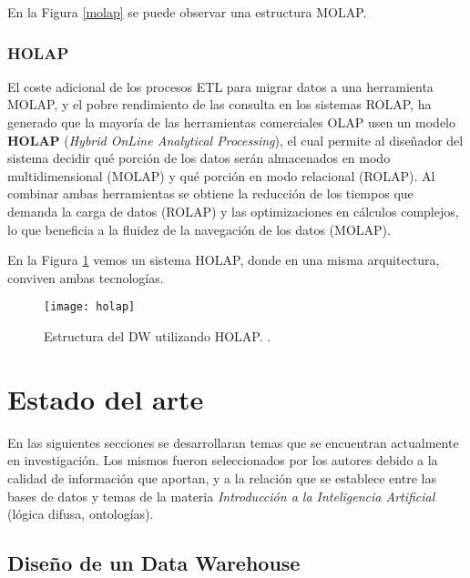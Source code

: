 \documentclass[a4paper,11pt]{article}
\begin{document}
    En la Figura \ref{molap} se puede observar una estructura MOLAP.
    
    \subsubsection{HOLAP}

    El coste adicional de los procesos ETL para migrar datos a una herramienta MOLAP, y el pobre rendimiento de las consulta en los sistemas ROLAP, ha generado que la
    mayoría de las herramientas comerciales OLAP usen un modelo \textbf{HOLAP} (\textit{Hybrid OnLine Analytical Processing}), el cual permite al diseñador del sistema
    decidir qué porción de los datos serán almacenados en modo multidimensional (MOLAP) y qué porción en modo relacional (ROLAP). Al combinar ambas herramientas
    se obtiene la reducción de los tiempos que demanda la carga de datos (ROLAP) y las optimizaciones en cálculos complejos, lo que beneficia a la fluidez de la
    navegación de los datos (MOLAP).
    
    En la Figura \ref{holap} vemos un sistema HOLAP, donde en una misma arquitectura, conviven ambas tecnologías.
    
    \begin{figure}
      \begin{center}
        \texttt{[image: holap]}
        \caption{Estructura del DW utilizando HOLAP. \cite[p.~82]{nagabhushana}.}
        \label{holap}
      \end{center}
    \end{figure}


  
    \section{Estado del arte} \label{estado_arte}
    
    En las siguientes secciones se desarrollaran temas que se encuentran actualmente en investigación. Los mismos fueron seleccionados por los autores
    debido a la calidad de información que aportan, y a la relación que se establece entre las bases de datos y temas de la materia
    \textit{Introducción a la Inteligencia Artificial} (lógica difusa, ontologías).
    
    \subsection{Diseño de un Data Warehouse}
    
\end{document}
